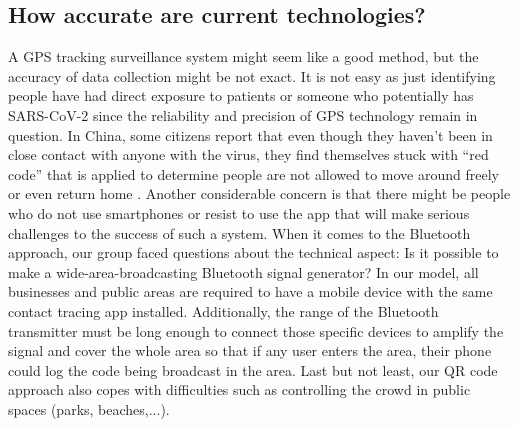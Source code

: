  \subsection{How accurate are current technologies?}
    \par A GPS tracking surveillance system might seem like a good method, but the accuracy of data collection might be not exact. It is not easy as just identifying people have had direct exposure to patients or someone who potentially has SARS-CoV-2 since the reliability and precision of GPS technology remain in question. In China, some citizens report that even though they haven’t been in close contact with anyone with the virus, they find themselves stuck with “red code” that is applied to determine people are not allowed to move around freely or even return home \parencite{Questions2}. Another considerable concern is that there might be people who do not use smartphones or resist to use the app that will make serious challenges to the success of such a system. When it comes to the Bluetooth approach, our group faced questions about the technical aspect: Is it possible to make a wide-area-broadcasting Bluetooth signal generator? In our model, all businesses and public areas are required to have a mobile device with the same contact tracing app installed. Additionally, the range of the Bluetooth transmitter must be long enough to connect those specific devices to amplify the signal and cover the whole area so that if any user enters the area, their phone could log the code being broadcast in the area. Last but not least, our QR code approach also copes with difficulties such as controlling the crowd in public spaces (parks, beaches,...).
    
